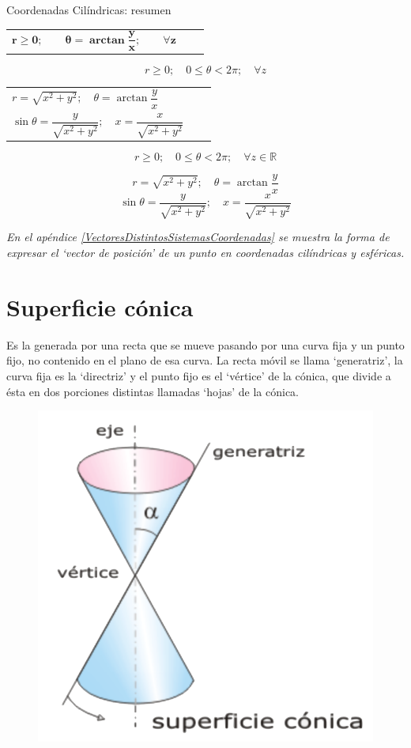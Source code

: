 \vspace{10mm} %
\begin{myblock}{Coordenadas Cilíndricas: resumen}
\begin{table}[H]
\centering
\begin{tabular}{lll}
$\boldsymbol{ r\ge 0 }; \qquad  \boldsymbol{ \theta=\arctan \dfrac y x  }; \qquad  \boldsymbol{\forall z}$
\end{tabular}
\end{table}

\vspace{-5mm}$$r\ge 0;\quad 0\le \theta < 2\pi;\quad \forall z$$

\begin{table}[H]
\centering
\begin{tabular}{lll}
$r=\sqrt{x^2+y^2}; \quad \theta=\arctan \dfrac y x$ \\
$\sin \theta=\dfrac y {\sqrt{x^2+y^2}};\quad x= \dfrac x {\sqrt{x^2+y^2}}$ 
\end{tabular}
\end{table}
\end{myblock}


$$ r\ge 0;\quad 0\le \theta < 2 \pi;\quad \forall z \in \mathbb R$$


$$r=\sqrt{x^2+y^2}; \quad \theta=\arctan \dfrac y x$$
$$\sin \theta=\dfrac y {\sqrt{x^2+y^2}};\quad x= \dfrac x {\sqrt{x^2+y^2}}$$


\textit{En el apéndice \ref{VectoresDistintosSistemasCoordenadas} se muestra la forma de expresar el `vector de posición' de un punto en coordenadas cilíndricas y esféricas.}


\section{Superficie cónica}

\begin{multicols}{2}
Es la generada por una recta que se mueve pasando por una curva fija y un punto fijo, no contenido en el plano de esa curva. La recta móvil se llama `generatriz', la curva fija es la `directriz' y el punto fijo es el `vértice' de la cónica, que divide a ésta en dos porciones distintas llamadas `hojas' de la cónica.
	\begin{figure}[H]
		\centering
		\includegraphics[width=.4\textwidth]{imagenes/imagenes12/T12IM07.png}
	\end{figure}
\end{multicols}


